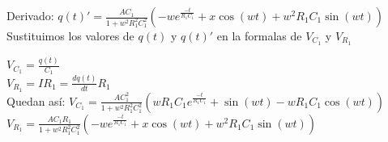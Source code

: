 \documentclass[12pt]{article}
\newcommand{\derivada}[2]{\displaystyle{\frac{d#1}{d#2}}}
\newcommand{\e}[1]{e^{#1}}
\newcommand{\escribir}[1]{\singlespacing#1\singlespacing}
\newcommand{\fraccion}[2]{\displaystyle\frac{#1}{#2}}
\begin{document}
	\escribir{Derivado:}
	$q(t)'=\fraccion{AC_1}{1+w^2R_1^2C_1^2}(-w\e{\frac{-t}{R_1C_1}}+x\cos(wt)+w^2R_1C_1\sin(wt))$\\
		
	\escribir{Sustituimos los valores de $q(t)$ y $q(t)'$  en la formalas de $V_{C_1}$ y $V_{R_1}$ }

	$V_{C_1}=\displaystyle{\frac{q(t)}{C_1}} $\\

	$V_{R_1}=IR_1=\derivada{q(t)}{t}R_1$\\

	\escribir{Quedan así:}
	$V_{C_1}=\fraccion{AC_1^2}{1+w^2R_1^2C_1^2}(wR_1C_1\e{\frac{-t}{R_1C_1}}+\sin(wt)-wR_1C_1\cos(wt))$\\

	$V_{R_1}=\fraccion{AC_1R_1}{1+w^2R_1^2C_1^2}(-w\e{\frac{-t}{R_1C_1}}+x\cos(wt)+w^2R_1C_1\sin(wt))$\\

\end{document}
